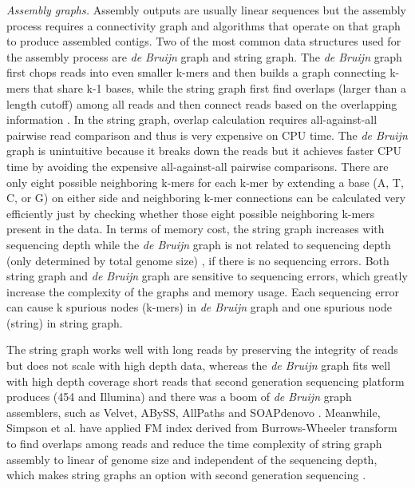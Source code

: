 \documentclass[]{msu-thesis}
\begin{document}

\textit{Assembly graphs. } Assembly outputs are usually linear sequences
but the assembly process requires a connectivity graph and algorithms
that operate on that graph to produce assembled contigs. Two of the most
common data structures used for the assembly process are \textit{de
Bruijn} graph and string graph.  The \textit{de Bruijn} graph first
chops reads into even smaller k-mers and then builds a graph connecting
k-mers that share k-1 bases, while the string graph first find overlaps
(larger than a length cutoff) among all reads and then connect reads
based on the overlapping information
\cite{zerbino_velvet:_2008,simpson_efficient_2012}. In the string graph,
overlap calculation requires all-against-all pairwise read comparison
and thus is very expensive on CPU time. The \textit{de Bruijn} graph is
unintuitive because it breaks down the reads but it achieves faster CPU
time by avoiding the expensive all-against-all pairwise comparisons.
There are only eight possible neighboring k-mers for each k-mer by
extending a base (A, T, C, or G) on either side and neighboring k-mer
connections can be calculated very efficiently just by checking whether
those eight possible neighboring k-mers present in the data.  In terms
of memory cost, the string graph increases with sequencing depth while
the \textit{de Bruijn} graph is not related to sequencing depth (only
determined by total genome size) \cite{li_comparison_2012}, if there is
no sequencing errors.  Both string graph and \textit{de Bruijn} graph
are sensitive to sequencing errors, which greatly increase the
complexity of the graphs and memory usage. Each sequencing error can
cause k spurious nodes (k-mers) in \textit{de Bruijn} graph and one
spurious node (string) in string graph.


The string graph works well with long reads by preserving the
integrity of reads but does not scale with high depth data, whereas
the \textit{de Bruijn} graph fits well with high depth coverage short
reads that second generation sequencing platform produces (454 and
Illumina) and there was a boom of \textit{de Bruijn} graph assemblers,
such as Velvet, ABySS, AllPaths and SOAPdenovo
\cite{zerbino_velvet:_2008,simpson_abyss:_2009,butler_allpaths:_2008,luo_soapdenovo2:_2012}. Meanwhile,
Simpson et al. have applied FM index derived from Burrows-Wheeler
transform to find overlaps among reads and reduce the time complexity
of string graph assembly to linear of genome size and independent of
the sequencing depth, which makes string graphs an option with
second generation sequencing \cite{simpson_efficient_2012}.
\end{document}
